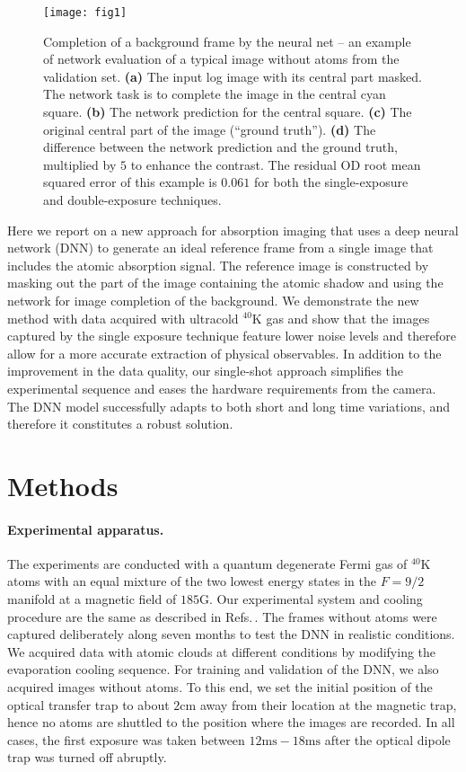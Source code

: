 \documentclass[twocolumn,groupedaddress,longbibliography]{revtex4-1}
\begin{document}
\begin{figure*}
\centering
\texttt{[image: fig1]}
\caption{Completion of a background frame by the neural net -- an example of network evaluation of a typical image without atoms from the validation set.
	\textbf{(a)} The input log image with its central part masked. The network task is to complete the image in the central cyan square.
	\textbf{(b)} The network prediction for the central square.
	\textbf{(c)} The original central part of the image (``ground truth'').
	\textbf{(d)} The difference between the network prediction and the ground truth, multiplied by $5$ to enhance the contrast. The residual OD root mean squared error of this example is $0.061$ for both the single-exposure and double-exposure techniques.
}
\label{fig:no_atoms}
\end{figure*}

Here we report on a new approach for absorption imaging that uses a deep neural network (DNN) to generate an ideal reference frame from a single image that includes the atomic absorption signal. The reference image is constructed by masking out the part of the image containing the atomic shadow and using the network for image completion of the background. We demonstrate the new method with data acquired with ultracold $^{40}\mathrm{K}$ gas and show that the images captured by the single exposure technique feature lower noise levels and therefore allow for a more accurate extraction of physical observables. In addition to the improvement in the data quality, our single-shot approach simplifies the experimental sequence and eases the hardware requirements from the camera. The DNN model successfully adapts to both short and long time variations, and therefore it constitutes a robust solution.


\section{Methods}

\paragraph*{Experimental apparatus.}

The experiments are conducted with a quantum degenerate Fermi gas of $^{40}\mathrm{K}$ atoms with an equal mixture of the two lowest energy states in the $F=9/2$ manifold at a magnetic field of $185$G. Our experimental system and cooling procedure are the same as described in Refs.\,\cite{Shkedrov2018,Ness2018}. The frames without atoms were captured deliberately along seven months to test the DNN in realistic conditions. We acquired data with atomic clouds at different conditions by modifying the evaporation cooling sequence. For training and validation of the DNN, we also acquired images without atoms. To this end, we set the initial position of the optical transfer trap to about $2\mathrm{cm}$ away from their location at the magnetic trap, hence no atoms are shuttled to the position where the images are recorded. In all cases, the first exposure was taken between $12\mathrm{ms}-18\mathrm{ms}$ after the optical dipole trap was turned off abruptly.
\end{document}
